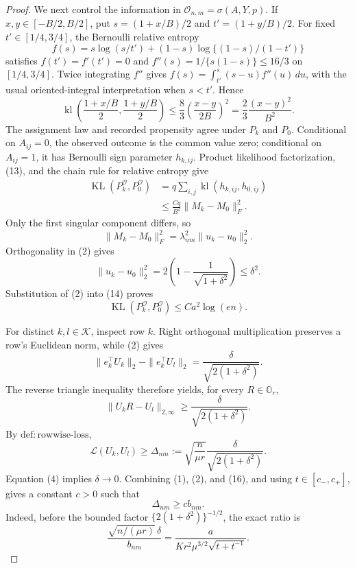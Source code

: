 \documentclass{article}
\begin{document}
\begin{proof}
We next control the information in \(\mathcal O_{n,m}=\sigma(A,Y,p)\).  If \(x,y\in[-B/2,B/2]\), put \(s=(1+x/B)/2\) and \(t'=(1+y/B)/2\).  For fixed \(t'\in[1/4,3/4]\), the Bernoulli relative entropy
\[
 f(s)=s\log(s/t')+(1-s)\log\{(1-s)/(1-t')\}
\]
satisfies \(f(t')=f'(t')=0\) and \(f''(s)=1/\{s(1-s)\}\le16/3\) on \([1/4,3/4]\).  Twice integrating \(f''\) gives \(f(s)=\int_{t'}^s(s-u)f''(u)\,du\), with the usual oriented-integral interpretation when \(s<t'\).  Hence
\[
 \operatorname{kl}\left(\frac{1+x/B}{2},\frac{1+y/B}{2}\right)
 \le \frac{8}{3}\left(\frac{x-y}{2B}\right)^2
 =\frac{2}{3}\frac{(x-y)^2}{B^2}.
 \tag{13}
\]
The assignment law and recorded propensity agree under \(P_k\) and \(P_0\).  Conditional on \(A_{ij}=0\), the observed outcome is the common value zero; conditional on \(A_{ij}=1\), it has Bernoulli sign parameter \(h_{k,ij}\).  Product likelihood factorization, (13), and the chain rule for relative entropy give
\[
 \begin{aligned}
 \operatorname{KL}(P_k^{\mathcal O},P_0^{\mathcal O})
 &=q\sum_{i,j}\operatorname{kl}(h_{k,ij},h_{0,ij})\\
 &\le \frac{Cq}{B^2}\|M_k-M_0\|_F^2.
 \end{aligned}
 \tag{14}
\]
Only the first singular component differs, so
\[
 \|M_k-M_0\|_F^2
 =\lambda_{nm}^2\|u_k-u_0\|_2^2.
\]
Orthogonality in (2) gives
\[
 \|u_k-u_0\|_2^2
 =2\left(1-\frac1{\sqrt{1+\delta^2}}\right)\le\delta^2.
\]
Substitution of (2) into (14) proves
\[
 \operatorname{KL}(P_k^{\mathcal O},P_0^{\mathcal O})
 \le Ca^2\log(en).
 \tag{15}
\]

For distinct \(k,l\in\mathcal K\), inspect row \(k\).  Right orthogonal multiplication preserves a row's Euclidean norm, while (2) gives
\[
 \|e_k^\top U_k\|_2-\|e_k^\top U_l\|_2
 =\frac{\delta}{\sqrt{2(1+\delta^2)}}.
\]
The reverse triangle inequality therefore yields, for every \(R\in\mathbb O_r\),
\[
 \|U_kR-U_l\|_{2,\infty}
 \ge\frac{\delta}{\sqrt{2(1+\delta^2)}}.
\]
By \(\mathrm{def:rowwise\mbox{-}loss}\),
\[
 \mathcal L(U_k,U_l)
 \ge\Delta_{nm}:=\sqrt{\frac n{\mu r}}
       \frac{\delta}{\sqrt{2(1+\delta^2)}}.
 \tag{16}
\]
Equation (4) implies \(\delta\to0\).  Combining (1), (2), and (16), and using \(t\in[c_-,c_+]\), gives a constant \(c>0\) such that
\[
 \Delta_{nm}\ge c b_{nm}.
 \tag{17}
\]
Indeed, before the bounded factor \(\{2(1+\delta^2)\}^{-1/2}\), the exact ratio is
\[
 \frac{\sqrt{n/(\mu r)}\,\delta}{b_{nm}}
 =\frac{a}{K r^2\mu^{3/2}\sqrt{t+t^{-1}}}.
\]


\end{proof}
\end{document}
